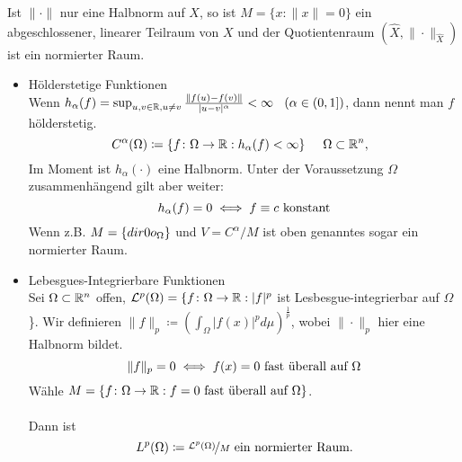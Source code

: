 \begin{bemerkung}
	Ist $\| \cdot \|$ nur eine Halbnorm auf $X$, so ist $M = \{ x: \| x \| = 0 \}$ ein abgeschlossener, linearer Teilraum von $X$ und der Quotientenraum $(\hat X, \| \cdot \|_{\hat X})$ ist ein normierter Raum.
\end{bemerkung}
\newcommand{\rquot}[2]{\raisebox{0.5ex}{$#1$}\!/\!\raisebox{-0.5ex}{$#2$}}
\begin{beispiel}
	\begin{itemize}
		\item Hölderstetige Funktionen  \\
			Wenn $h_{\alpha}(f) = \sup_{u,v \in \mathbb{R}, u \neq v} \frac{\| f(u) - f(v)\|}{|u - v|^{\alpha}} < \infty \hspace{0.25cm} \left( \alpha \in (0, 1] \right)$, dann nennt man $f$ hölderstetig.
			\[ C^{\alpha}(\Omega) \coloneqq \{ f \colon \Omega \rightarrow \mathbb{R}: h_{\alpha}(f) < \infty \} \hspace{0.5cm} \Omega \subset \mathbb{R}^{n}, \hspace{0.25cm} \]
			Im Moment ist $h_{\alpha}( \cdot )$ eine Halbnorm. Unter der Voraussetzung $\Omega$ zusammenhängend gilt aber weiter:
			\[ h_{\alpha}(f) = 0 \iff f \equiv c \text{ konstant} \]
			Wenn z.B. $M = \{ \1_\Omega \}$ und $V = C^{\alpha}/M$ ist oben genanntes sogar ein normierter Raum.
		\item Lebesgues-Integrierbare Funktionen  \\
			Sei $\Omega \subset \mathbb{R}^{n}$ offen, $\mathcal{L}^{p}(\Omega) = \{ f \colon \Omega \rightarrow \mathbb{R} : |f|^{p}$ ist Lesbesgue-integrierbar auf $\Omega$  \}.
			Wir definieren $\| f \|_{p} \coloneqq \left( \int_{\Omega} |f(x)|^{p} d\mu \right)^{\frac{1}{p}}$, wobei $\| \cdot \|_{p}$ hier eine Halbnorm bildet.
			\[ \| f \|_{p} = 0 \iff  f(x) = 0 \text{ fast überall auf } \Omega \]
			Wähle $M = \{ f \colon \Omega \rightarrow \mathbb{R}: f = 0 \text{ fast überall auf } \Omega \}$. \\ \\
			Dann ist 
			\[ L^{p}(\Omega) \coloneqq \nicefrac{ \mathcal{L}^{p}(\Omega) }{ M } \text{ ein normierter Raum.} \]
	\end{itemize}
\end{beispiel}



\newpage